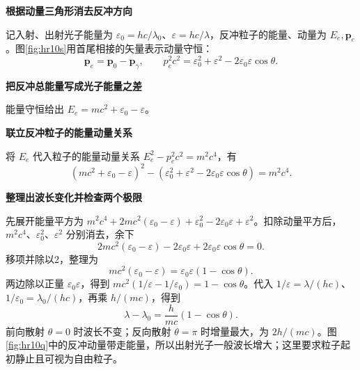 \begin{solution}\textbf{根据动量三角形消去反冲方向}\par\nobreak
记入射、出射光子能量为 $\varepsilon_0=hc/\lambda_0$、$\varepsilon=hc/\lambda$，反冲粒子的能量、动量为 $E_e,\bm p_e$。图\ref{fig:hr10s}用首尾相接的矢量表示动量守恒：
\[
\bm p_e=\bm p_0-\bm p_\gamma,\qquad
p_e^2c^2=\varepsilon_0^2+\varepsilon^2-2\varepsilon_0\varepsilon\cos\theta.
\]


\par\medskip{}\noindent\textbf{把反冲总能量写成光子能量之差}\par\nobreak
能量守恒给出 $E_e=mc^2+\varepsilon_0-\varepsilon$。



\par\medskip{}\noindent\textbf{联立反冲粒子的能量动量关系}\par\nobreak
将 $E_e$ 代入粒子的能量动量关系 $E_e^2-p_e^2c^2=m^2c^4$，有
\[
(mc^2+\varepsilon_0-\varepsilon)^2
-\left(\varepsilon_0^2+\varepsilon^2-2\varepsilon_0\varepsilon\cos\theta\right)
=m^2c^4.
\]


\par\medskip{}\noindent\textbf{整理出波长变化并检查两个极限}\par\nobreak
先展开能量平方为 $m^2c^4+2mc^2(\varepsilon_0-\varepsilon)+\varepsilon_0^2-2\varepsilon_0\varepsilon+\varepsilon^2$。扣除动量平方后，$m^2c^4$、$\varepsilon_0^2$、$\varepsilon^2$ 分别消去，余下
\[
 2mc^2(\varepsilon_0-\varepsilon)-2\varepsilon_0\varepsilon
 +2\varepsilon_0\varepsilon\cos\theta=0.
\]
移项并除以2，整理为
\[
mc^2(\varepsilon_0-\varepsilon)
=\varepsilon_0\varepsilon(1-\cos\theta).
\]
两边除以正量 $\varepsilon_0\varepsilon$，得到 $mc^2(1/\varepsilon-1/\varepsilon_0)=1-\cos\theta$。代入 $1/\varepsilon=\lambda/(hc)$、$1/\varepsilon_0=\lambda_0/(hc)$，再乘 $h/(mc)$，得到
\[
\boxed{\lambda-\lambda_0=\frac h{mc}(1-\cos\theta).}
\]
前向散射 $\theta=0$ 时波长不变；反向散射 $\theta=\pi$ 时增量最大，为 $2h/(mc)$。图\ref{fig:hr10q}中的反冲动量带走能量，所以出射光子一般波长增大；这里要求粒子起初静止且可视为自由粒子。




\end{solution}

